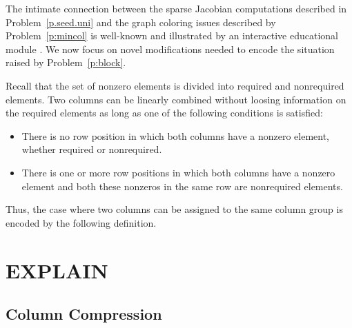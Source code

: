 \documentclass[12pt, oneside]{book}
\begin{document}
The intimate connection between the sparse Jacobian computations described in
Problem~\ref{p.seed.uni} and the graph coloring issues described by Problem~\ref{p:mincol} is
well-known and illustrated by an interactive educational module \cite{2013:05}. We now
focus on novel modifications needed to encode the situation raised by
Problem~\ref{p:block}.

Recall that the set of nonzero elements is divided into required and nonrequired
elements. Two columns can be linearly combined without loosing information on the
required elements as long as one of the following conditions is satisfied:
\begin{itemize}
  \item There is no row position in which both columns have a nonzero element, whether
      required or nonrequired.
  \item There is one or more row positions in which both columns have a nonzero element
      and both these nonzeros in the same row are nonrequired elements.
\end{itemize}

Thus, the case where two columns can be assigned to the same column group is encoded by
the following definition.

\chapter{EXPLAIN}
\section{Column Compression}
\cite{2013:05,2014:01}
\end{document}
